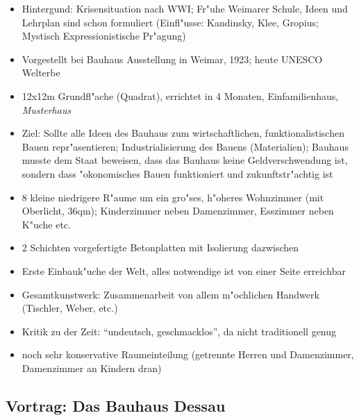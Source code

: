 \documentclass[emulatestandardclasses]{scrartcl}
\begin{document}
\begin{itemize}
  \item Hintergund: Krisensituation nach WWI; Fr"uhe Weimarer Schule, Ideen und Lehrplan sind schon formuliert (Einfl"usse: Kandinsky, Klee, Gropius; Mystisch Expressionistische Pr"agung)
  \item Vorgestellt bei Bauhaus Ausstellung in Weimar, 1923; heute UNESCO Welterbe
  \item 12x12m Grundfl"ache (Quadrat), errichtet in 4 Monaten, Einfamilienhaus, \emph{Musterhaus}
  \item Ziel: Sollte alle Ideen des Bauhaus zum wirtschaftlichen, funktionalistischen Bauen repr"asentieren; Industrialisierung des Bauens (Materialien); Bauhaus musste dem Staat beweisen, dass das Bauhaus keine Geldverschwendung ist, sondern dass "okonomisches Bauen funktioniert und zukunftstr"achtig ist
  \item 8 kleine niedrigere R"aume um ein gro"ses, h"oheres Wohnzimmer (mit Oberlicht, 36qm); Kinderzimmer neben Damenzimmer, Esszimmer neben K"uche etc.
  \item 2 Schichten vorgefertigte Betonplatten mit Isolierung dazwischen
  \item Erste Einbauk"uche der Welt, alles notwendige ist von einer Seite erreichbar
  \item Gesamtkunstwerk: Zusammenarbeit von allem m"ochlichen Handwerk (Tischler, Weber, etc.)
  \item Kritik zu der Zeit: "`undeutsch, geschmacklos"', da nicht traditionell genug
  \item noch sehr konservative Raumeinteilung (getrennte Herren und Damenzimmer, Damenzimmer an Kindern dran)
\end{itemize}

\subsection{Vortrag: Das Bauhaus Dessau}
\end{document}
